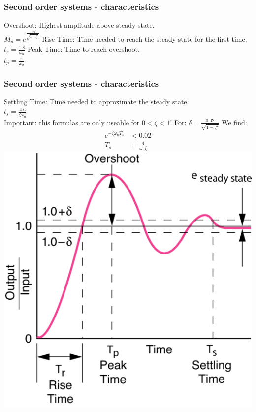 \begin{frame}
\frametitle{Second order systems - characteristics}
Overshoot: Highest amplitude above steady state.\\ 
$M_p = e^{\frac{-\pi\zeta}{\sqrt{1-\zeta^2}}}$
\vspace{0.12cm}
Rise Time: Time needed to reach the steady state for the first time. $t_r = \frac{1.8}{\omega_n}$
\vspace{0.12cm}
Peak Time: Time to reach overshoot.\\$t_p =\frac{\pi}{\omega_d}$
\vspace{-0.2cm} 
\begin{figure}
\end{figure}
\end{frame}

\begin{frame}
\frametitle{Second order systems - characteristics}
Settling Time: Time needed to approximate the steady state.\\
$t_s = \frac{4.6}{\zeta\omega_n}$
\\ Important: this formulas are only useable for $0<\zeta<1$!
\vspace{0.12cm}
For: $\delta = \frac{0.02}{\sqrt{1-\zeta^2}}$
\vspace{0.12cm}
We find:
\vspace{-0.6cm}
\begin{align*}
 e^{-\zeta\omega_n T_s} &< 0.02\\
 T_s &= \frac{4}{\omega_n\zeta}
\end{align*}
\vspace{-1cm}
\includegraphics[width=0.3\linewidth]{Afbeelding7}
\end{frame}

